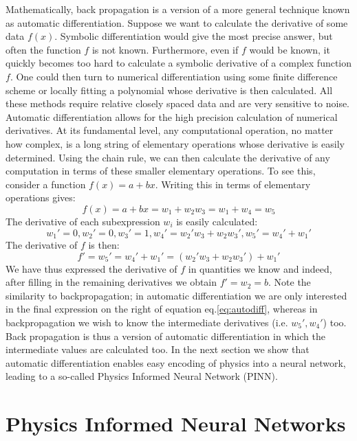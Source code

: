 \documentclass{Dissertate}
\begin{document}
Mathematically, back propagation is a version of a more general
technique known as automatic differentiation. Suppose we want to
calculate the derivative of some data \(f(x)\). Symbolic differentiation
would give the most precise answer, but often the function \(f\) is not
known. Furthermore, even if \(f\) would be known, it quickly becomes too
hard to calculate a symbolic derivative of a complex function \(f\). One
could then turn to numerical differentiation using some finite
difference scheme or locally fitting a polynomial whose derivative is
then calculated. All these methods require relative closely spaced data
and are very sensitive to noise. Automatic differentiation allows for
the high precision calculation of numerical derivatives. At its
fundamental level, any computational operation, no matter how complex,
is a long string of elementary operations whose derivative is easily
determined. Using the chain rule, we can then calculate the derivative
of any computation in terms of these smaller elementary operations. To
see this, consider a function \(f(x) = a + bx\). Writing this in terms
of elementary operations gives: \[
f(x) = a+bx = w_1+ w_2w_3=w_1+w_4=w_5
\] The derivative of each subexpression \(w_i\) is easily calculated: \[
w_1' = 0, w_2'= 0, w_3'=1,w_4'=w_2'w_3+w_2w_3', w_5'=w_4'+w_1'
\] The derivative of \(f\) is then: \begin{equation}
f' = w_5' = w_4'+w_1' = (w_2'w_3+w_2w_3')+w_1'
\label{eq:autodiff}\end{equation} We have thus expressed the derivative
of \(f\) in quantities we know and indeed, after filling in the
remaining derivatives we obtain \(f' = w_2 =b\). Note the similarity to
backpropagation; in automatic differentiation we are only interested in
the final expression on the right of equation eq.\ref{eq:autodiff},
whereas in backpropagation we wish to know the intermediate derivatives
(i.e. \(w_5', w_4'\)) too. Back propagation is thus a version of
automatic differentiation in which the intermediate values are
calculated too. In the next section we show that automatic
differentiation enables easy encoding of physics into a neural network,
leading to a so-called Physics Informed Neural Network (PINN).

\hypertarget{physics-informed-neural-networks-1}{%
\section{Physics Informed Neural
Networks}\label{physics-informed-neural-networks-1}}
\end{document}
